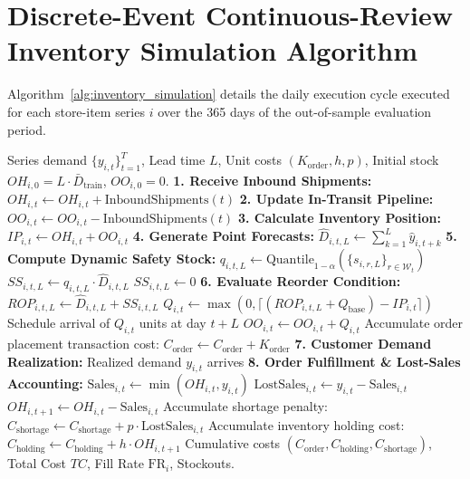 \documentclass[11pt,a4paper]{article}
\begin{document}
\section{Discrete-Event Continuous-Review Inventory Simulation Algorithm}
\label{app:algorithm}

Algorithm~\ref{alg:inventory_simulation} details the daily execution cycle executed for each store-item series $i$ over the 365 days of the out-of-sample evaluation period.

\begin{algorithm}[htbp]
\small
\caption{Daily Discrete-Event Replenishment Simulation with Lost-Sales Accounting}
\label{alg:inventory_simulation}
\begin{algorithmic}[1]
\REQUIRE Series demand $\{y_{i,t}\}_{t=1}^T$, Lead time $L$, Unit costs $(K_{\text{order}}, h, p)$, Initial stock $OH_{i,0} = L \cdot \bar{D}_{\text{train}}$, $OO_{i,0} = 0$.
    \STATE \textbf{1. Receive Inbound Shipments:} $OH_{i,t} \leftarrow OH_{i,t} + \text{InboundShipments}(t)$
    \STATE \textbf{2. Update In-Transit Pipeline:} $OO_{i,t} \leftarrow OO_{i,t} - \text{InboundShipments}(t)$
    \STATE \textbf{3. Calculate Inventory Position:} $IP_{i,t} \leftarrow OH_{i,t} + OO_{i,t}$
    \STATE \textbf{4. Generate Point Forecasts:} $\hat{D}_{i,t,L} \leftarrow \sum_{k=1}^L \hat{y}_{i,t+k}$
    \STATE \textbf{5. Compute Dynamic Safety Stock:} 
        \STATE $q_{i,t,L} \leftarrow \text{Quantile}_{1-\alpha}\left( \{s_{i,r,L}\}_{r \in \mathcal{W}_t} \right)$
        \STATE $SS_{i,t,L} \leftarrow q_{i,t,L} \cdot \hat{D}_{i,t,L}$
    \ELSE
        \STATE $SS_{i,t,L} \leftarrow 0$
    \ENDIF
    \STATE \textbf{6. Evaluate Reorder Condition:} $ROP_{i,t,L} \leftarrow \hat{D}_{i,t,L} + SS_{i,t,L}$
        \STATE $Q_{i,t} \leftarrow \max\left(0, \lceil (ROP_{i,t,L} + Q_{\text{base}}) - IP_{i,t} \rceil\right)$
        \STATE Schedule arrival of $Q_{i,t}$ units at day $t+L$
        \STATE $OO_{i,t} \leftarrow OO_{i,t} + Q_{i,t}$
        \STATE Accumulate order placement transaction cost: $C_{\text{order}} \leftarrow C_{\text{order}} + K_{\text{order}}$
    \ENDIF
    \STATE \textbf{7. Customer Demand Realization:} Realized demand $y_{i,t}$ arrives
    \STATE \textbf{8. Order Fulfillment \& Lost-Sales Accounting:}
    \STATE $\text{Sales}_{i,t} \leftarrow \min(OH_{i,t}, y_{i,t})$
    \STATE $\text{LostSales}_{i,t} \leftarrow y_{i,t} - \text{Sales}_{i,t}$
    \STATE $OH_{i,t+1} \leftarrow OH_{i,t} - \text{Sales}_{i,t}$
    \STATE Accumulate shortage penalty: $C_{\text{shortage}} \leftarrow C_{\text{shortage}} + p \cdot \text{LostSales}_{i,t}$
    \STATE Accumulate inventory holding cost: $C_{\text{holding}} \leftarrow C_{\text{holding}} + h \cdot OH_{i,t+1}$
\ENDFOR
\ENSURE Cumulative costs $(C_{\text{order}}, C_{\text{holding}}, C_{\text{shortage}})$, Total Cost $TC$, Fill Rate $\text{FR}_i$, Stockouts.
\end{algorithmic}
\end{algorithm}
\end{document}
